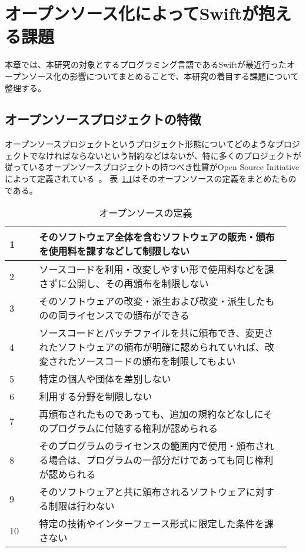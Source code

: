 \chapter{オープンソース化によってSwiftが抱える課題}
\label{open-source}

本章では、本研究の対象とするプログラミング言語であるSwiftが最近行ったオープンソース化の影響についてまとめることで、本研究の着目する課題について整理する。

\section{オープンソースプロジェクトの特徴}
\label{open-source:feature}

オープンソースプロジェクトというプロジェクト形態についてどのようなプロジェクトでなければならないという制約などはないが、特に多くのプロジェクトが従っているオープンソースプロジェクトの持つべき性質がOpen Source Initiativeによって定義されている~\cite{opensource}。
表~\ref{table:open-source-definition}はそのオープンソースの定義をまとめたものである。

\begin{table}[!hbtp]
    \begin{center}
        \caption{オープンソースの定義}
        \begin{tabular}{|p{0.1\linewidth}|p{0.85\linewidth}|}
            \hline
            1 & そのソフトウェア全体を含むソフトウェアの販売・頒布を使用料を課すなどして制限しない \\
            \hline
            2 & ソースコードを利用・改変しやすい形で使用料などを課さずに公開し、その再頒布を制限しない \\
            \hline
            3 & そのソフトウェアの改変・派生および改変・派生したものの同ライセンスでの頒布ができる \\
            \hline
            4 & ソースコードとパッチファイルを共に頒布でき、変更されたソフトウェアの頒布が明確に認められていれば、改変されたソースコードの頒布を制限してもよい \\
            \hline
            5 & 特定の個人や団体を差別しない \\
            \hline
            6 & 利用する分野を制限しない \\
            \hline
            7 & 再頒布されたものであっても、追加の規約などなしにそのプログラムに付随する権利が認められる \\
            \hline
            8 & そのプログラムのライセンスの範囲内で使用・頒布される場合は、プログラムの一部分だけであっても同じ権利が認められる \\
            \hline
            9 & そのソフトウェアと共に頒布されるソフトウェアに対する制限は行わない \\
            \hline
            10 & 特定の技術やインターフェース形式に限定した条件を課さない \\
            \hline
        \end{tabular}
        \label{table:open-source-definition}
    \end{center}
\end{table}

